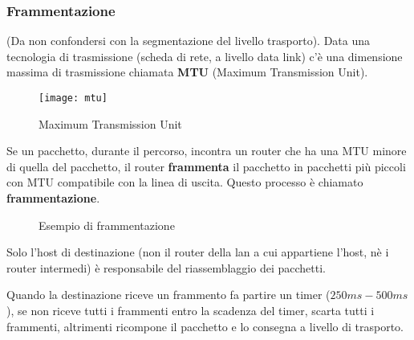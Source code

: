 \documentclass[a4paper]{article}
\begin{document}
\subsubsection{Frammentazione}
(Da non confondersi con la segmentazione del livello trasporto).
Data una tecnologia di trasmissione (scheda di rete, a livello data link) c'è una 
dimensione massima di trasmissione chiamata \textbf{MTU} (Maximum Transmission Unit).
\begin{figure}[H]
  \centering
  \texttt{[image: mtu]}
  \caption{Maximum Transmission Unit}
\end{figure}
\noindent
Se un pacchetto, durante il percorso, incontra un router che ha una MTU
minore di quella del pacchetto, il router \textbf{frammenta} il pacchetto in pacchetti
più piccoli con MTU compatibile con la linea di uscita.
Questo processo è chiamato \textbf{frammentazione}.
\begin{figure}[H]
  \centering
  \caption{Esempio di frammentazione}
\end{figure}

\noindent
Solo l'host di destinazione (non il router della lan a cui appartiene l'host,
nè i router intermedi) è responsabile del riassemblaggio dei pacchetti.

Quando la destinazione riceve un frammento fa partire un timer (\( 250ms-500ms \)),
se non riceve tutti i frammenti entro la scadenza del timer, scarta tutti i frammenti,
altrimenti ricompone il pacchetto e lo consegna a livello di trasporto.
\end{document}

